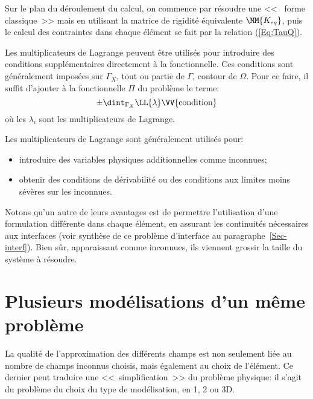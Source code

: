 \medskip
Sur le plan du déroulement du calcul, on commence par résoudre une <<~ forme classique~>>
mais en utilisant la matrice de rigidité équivalente $\MM{K_{eq}}$, puis le
calcul des contraintes dans chaque élément se fait par la relation (\ref{Eq:TauQ}).


\bigskip
Les multiplicateurs de Lagrange
peuvent être utilisés pour introduire
des conditions supplémentaires directement à la fonctionnelle.
Ces conditions sont généralement imposées sur $\Gamma_X$, tout ou
partie de $\Gamma$, contour de $\Omega$.
Pour ce faire, il suffit d'ajouter à la fonctionnelle $\Pi$
du problème le terme:
\begin{equation}
   \pm\dint_{\Gamma_X} \LL{\lambda}\VV{\text{condition}}
\end{equation}
où les $\lambda_i$ sont les multiplicateurs de Lagrange.

\medskip
Les multiplicateurs de Lagrange
sont généralement utilisés pour:
\begin{itemize}
   \item introduire des variables physiques additionnelles comme
         inconnues;
   \item obtenir des conditions de dérivabilité ou des conditions aux
         limites moins sévères sur les inconnues.
\end{itemize}

\medskip
Notons qu'un autre de leurs avantages est de permettre l'utilisation d'une formulation différente
dans chaque élément, en assurant les continuités nécessaires aux interfaces (voir synthèse
de ce problème d'interface au paragraphe~\ref{Sec-interf}).
Bien sûr, apparaissant comme inconnues, ils viennent grossir la taille du système à
résoudre.










\medskip
\section{Plusieurs modélisations d'un même problème}\label{Sec-PlusModel}

La qualité de l'approximation des différents champs est non seulement liée
au nombre de champs inconnus choisis, mais également au choix de l'élément.
Ce dernier peut traduire une <<~simplification~>> du problème physique:
il s'agit du problème du choix du type de modélisation, en 1, 2 ou 3D.

